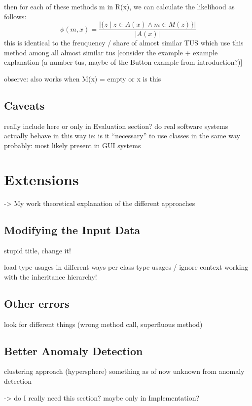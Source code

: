 then for each of these methods m in R(x), we can calculate the likelihood as follows:
\begin{equation*}
\phi(m, x) = \frac{|\{z \mid z \in A(x) \land m \in M(z)\}|}{|A(x)|}
\end{equation*}
this is identical to the freuquency / share of almost similar TUS which use this method among all almost similar tus
[consider the example + example explanation (a number tus, maybe of the Button example from introduction?)]

observe: also works when M(x) = empty or x is this

\subsection{Caveats}
really include here or only in Evaluation section?
do real software systems actually behave in this way
ie: is it ``necessary'' to use classes in the same way
probably: most likely present in GUI systems

\section{Extensions}
-> My work
theoretical explanation of the different approaches

\subsection{Modifying the Input Data}
stupid title, change it!

load type usages in different ways
    per class type usages / ignore context
    working with the inheritance hierarchy!

\subsection{Other errors}
    look for different things (wrong method call, superfluous method)

\subsection{Better Anomaly Detection}
    clustering approach (hypersphere)
    something as of now unknown from anomaly detection

    -> do I really need this section? maybe only in Implementation?
